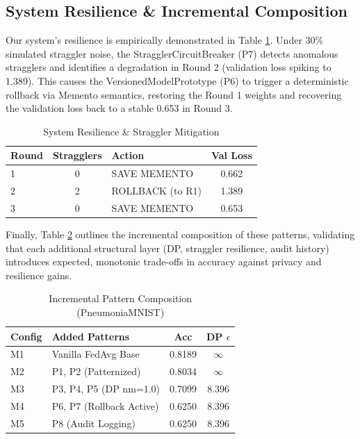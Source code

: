 \documentclass[10pt, conference]{IEEEtran}
\begin{document}
\subsection{System Resilience \& Incremental Composition}
Our system's resilience is empirically demonstrated in Table \ref{tab:resilience}. Under 30\% simulated straggler noise, the StragglerCircuitBreaker (P7) detects anomalous stragglers and identifies a degradation in Round 2 (validation loss spiking to 1.389). This causes the VersionedModelPrototype (P6) to trigger a deterministic rollback via Memento semantics, restoring the Round 1 weights and recovering the validation loss back to a stable 0.653 in Round 3.

\begin{table}[h]
\centering
\caption{System Resilience \& Straggler Mitigation}
\label{tab:resilience}
\begin{tabular}{lclc}
\toprule
\textbf{Round} & \textbf{Stragglers} & \textbf{Action} & \textbf{Val Loss} \\
\midrule
1 & 0 & SAVE MEMENTO & 0.662 \\
2 & 2 & ROLLBACK (to R1) & 1.389 \\
3 & 0 & SAVE MEMENTO & 0.653 \\
\bottomrule
\end{tabular}
\end{table}

Finally, Table \ref{tab:incremental} outlines the incremental composition of these patterns, validating that each additional structural layer (DP, straggler resilience, audit history) introduces expected, monotonic trade-offs in accuracy against privacy and resilience gains.

\begin{table}[h]
\centering
\caption{Incremental Pattern Composition (PneumoniaMNIST)}
\label{tab:incremental}
\begin{tabular}{llcc}
\toprule
\textbf{Config} & \textbf{Added Patterns} & \textbf{Acc} & \textbf{DP $\epsilon$} \\
\midrule
M1 & Vanilla FedAvg Base & 0.8189 & $\infty$ \\
M2 & P1, P2 (Patternized) & 0.8034 & $\infty$ \\
M3 & P3, P4, P5 (DP nm=1.0) & 0.7099 & 8.396 \\
M4 & P6, P7 (Rollback Active) & 0.6250 & 8.396 \\
M5 & P8 (Audit Logging) & 0.6250 & 8.396 \\
\bottomrule
\end{tabular}
\end{table}
\end{document}
